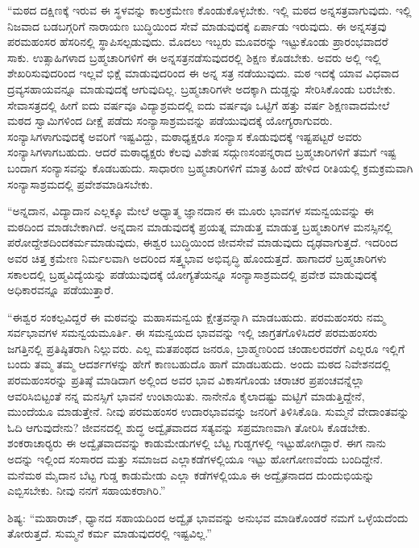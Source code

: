  “ಮಠದ ದಕ್ಷಿಣಕ್ಕೆ ಇರುವ ಈ ಸ್ಥಳವನ್ನು ಕಾಲಕ್ರಮೇಣ ಕೊಂಡುಕೊಳ್ಳಬೇಕು. ಇಲ್ಲಿ ಮಠದ ಅನ್ನಸತ್ರವಾಗುವುದು. ಇಲ್ಲಿ ನಿಜವಾದ ಬಡಬಗ್ಗರಿಗೆ ನಾರಾಯಣ ಬುದ್ಧಿಯಿಂದ ಸೇವೆ ಮಾಡುವುದಕ್ಕೆ ಏರ್ಪಾಡು ಇರುವುದು. ಈ ಅನ್ನಸತ್ರವು ಪರಮಹಂಸರ ಹೆಸರಿನಲ್ಲಿ ಸ್ಥಾಪಿಸಲ್ಪಡುವುದು. ಮೊದಲು ಇಬ್ಬರು ಮೂವರನ್ನು ಇಟ್ಟುಕೊಂಡು ಪ್ರಾರಂಭವಾದರೆ ಸಾಕು. ಉತ್ಸಾಹಿಗಳಾದ ಬ್ರಹ್ಮಚಾರಿಗಳಿಗೆ ಈ ಅನ್ನಸತ್ರ\break ನಡೆಸುವುದರಲ್ಲಿ ಶಿಕ್ಷಣ ಕೊಡಬೇಕು. ಅವರು ಅಲ್ಲಿ ಇಲ್ಲಿ ಶೇಖರಿಸುವುದರಿಂದ ಇಲ್ಲವೆ ಭಿಕ್ಷೆ ಮಾಡುವುದರಿಂದ ಈ ಅನ್ನ ಸತ್ರ ನಡೆಯುವುದು. ಮಠ ಇದಕ್ಕೆ ಯಾವ ವಿಧವಾದ ದ್ರವ್ಯಸಹಾಯವನ್ನೂ ಮಾಡುವುದಕ್ಕೆ ಆಗುವುದಿಲ್ಲ. ಬ್ರಹ್ಮಚಾರಿಗಳೇ ಅದಕ್ಕಾಗಿ ದುಡ್ಡನ್ನು ಸೇರಿಸಿಕೊಂಡು ಬರಬೇಕು. ಸೇವಾಸತ್ರದಲ್ಲಿ ಹೀಗೆ ಐದು ವರ್ಷವೂ ವಿದ್ಯಾಶ್ರಮದಲ್ಲಿ ಐದು ವರ್ಷವೂ ಒಟ್ಟಿಗೆ ಹತ್ತು ವರ್ಷ ಶಿಕ್ಷಣವಾದಮೇಲೆ ಮಠದ ಸ್ವಾಮಿಗಳಿಂದ ದೀಕ್ಷೆ ಪಡೆದು ಸಂನ್ಯಾಸಾಶ್ರಮವನ್ನು ಪಡೆಯುವುದಕ್ಕೆ ಯೋಗ್ಯರಾಗುವರು. ಸಂನ್ಯಾಸಿಗಳಾಗುವುದಕ್ಕೆ ಅವರಿಗೆ ಇಷ್ಟವಿದ್ದು, ಮಠಾಧ್ಯಕ್ಷರೂ ಸಂನ್ಯಾಸ ಕೊಡುವುದಕ್ಕೆ ಇಷ್ಟಪಟ್ಟರೆ ಅವರು ಸಂನ್ಯಾಸಿಗಳಾಗಬಹುದು. ಆದರೆ ಮಠಾಧ್ಯಕ್ಷರು ಕೆಲವು ವಿಶೇಷ ಸದ್ಗುಣಸಂಪನ್ನರಾದ ಬ್ರಹ್ಮಚಾರಿಗಳಿಗೆ ತಮಗೆ ಇಷ್ಟ ಬಂದಾಗ ಸಂನ್ಯಾಸವನ್ನು ಕೊಡಬಹುದು. ಸಾಧಾರಣ ಬ್ರಹ್ಮಚಾರಿಗಳಿಗೆ ಮಾತ್ರ ಹಿಂದೆ ಹೇಳಿದ ರೀತಿಯಲ್ಲಿ ಕ್ರಮಕ್ರಮವಾಗಿ ಸಂನ್ಯಾಸಾಶ್ರಮದಲ್ಲಿ ಪ್ರವೇಶಮಾಡಿಸಬೇಕು. 

 “ಅನ್ನದಾನ, ವಿದ್ಯಾದಾನ ಎಲ್ಲಕ್ಕೂ ಮೇಲೆ ಅಧ್ಯಾತ್ಮ ಜ್ಞಾನದಾನ ಈ ಮೂರು ಭಾವಗಳ ಸಮನ್ವಯವನ್ನು ಈ ಮಠದಿಂದ ಮಾಡಬೇಕಾಗಿದೆ. ಅನ್ನದಾನ ಮಾಡುವುದಕ್ಕೆ ಪ್ರಯತ್ನ ಮಾಡುತ್ತ ಮಾಡುತ್ತ ಬ್ರಹ್ಮಚಾರಿಗಳ ಮನಸ್ಸಿನಲ್ಲಿ ಪರೋದ್ದೇಶದಿಂದ\break ಕರ್ಮಮಾಡುವುದು, ಈಶ್ವರ ಬುದ್ಧಿಯಿಂದ ಜೀವಸೇವೆ ಮಾಡುವುದು ದೃಢವಾಗುತ್ತದೆ. ಇದರಿಂದ ಅವರ ಚಿತ್ತ ಕ್ರಮೇಣ ನಿರ್ಮಲವಾಗಿ ಅದರಿಂದ ಸತ್ತ್ವಭಾವ ಅಭಿವೃದ್ಧಿ ಹೊಂದುತ್ತದೆ. ಹಾಗಾದರೆ ಬ್ರಹ್ಮಚಾರಿಗಳು ಸಕಾಲದಲ್ಲಿ ಬ್ರಹ್ಮವಿದ್ಯೆಯನ್ನು ಪಡೆಯುವುದಕ್ಕೆ ಯೋಗ್ಯತೆಯನ್ನೂ ಸಂನ್ಯಾಸಾಶ್ರಮದಲ್ಲಿ ಪ್ರವೇಶ ಮಾಡುವುದಕ್ಕೆ ಅಧಿಕಾರವನ್ನೂ ಪಡೆಯುತ್ತಾರೆ. 

 “ಈಶ್ವರ ಸಂಕಲ್ಪವಿದ್ದರೆ ಈ ಮಠವನ್ನು ಮಹಾಸಮನ್ವಯ ಕ್ಷೇತ್ರವನ್ನಾಗಿ ಮಾಡಬಹುದು. ಪರಮಹಂಸರು ನಮ್ಮ ಸರ್ವಭಾವಗಳ ಸಮನ್ವಯಮೂರ್ತಿ. ಈ ಸಮನ್ವಯದ ಭಾವವನ್ನು ಇಲ್ಲಿ ಜಾಗ್ರತಗೊಳಿಸಿದರೆ ಪರಮಹಂಸರು ಜಗತ್ತಿನಲ್ಲಿ ಪ್ರತಿಷ್ಠಿತರಾಗಿ ನಿಲ್ಲುವರು. ಎಲ್ಲ ಮತಪಂಥದ ಜನರೂ, ಬ್ರಾಹ್ಮಣರಿಂದ ಚಂಡಾಲರವರೆಗೆ ಎಲ್ಲರೂ ಇಲ್ಲಿಗೆ ಬಂದು ತಮ್ಮ ತಮ್ಮ ಆದರ್ಶಗಳನ್ನು ಹೇಗೆ ಕಾಣಬಹುದೊ ಹಾಗೆ ಮಾಡಬಹುದು. ಅಂದು ಮಠದ ನಿವೇಶನದಲ್ಲಿ ಪರಮಹಂಸರನ್ನು ಪ್ರತಿಷ್ಠೆ ಮಾಡಿದಾಗ ಅಲ್ಲಿಂದ ಅವರ ಭಾವ ವಿಕಾಸಗೊಂಡು ಚರಾಚರ ಪ್ರಪಂಚವನ್ನೆಲ್ಲಾ ಆವರಿಸಿಬಿಟ್ಟಂತೆ ನನ್ನ ಮನಸ್ಸಿಗೆ ಭಾವನೆ ಉಂಟಾಯಿತು. ನಾನೇನೊ ಕೈಲಾದಷ್ಟು ಮಟ್ಟಿಗೆ ಮಾಡುತ್ತಿದ್ದೇನೆ, ಮುಂದೆಯೂ ಮಾಡುತ್ತೇನೆ. ನೀವು ಪರಮಹಂಸರ ಉದಾರಭಾವವನ್ನು ಜನರಿಗೆ ತಿಳಿಸಿಕೊಡಿ. ಸುಮ್ಮನೆ ವೇದಾಂತವನ್ನು ಓದಿ ಆಗುವುದೇನು? ಜೀವನದಲ್ಲಿ ಶುದ್ಧ ಅದ್ವೈತವಾದದ ಸತ್ಯವನ್ನು ಸಪ್ರಮಾಣವಾಗಿ ತೋರಿಸಿ ಕೊಡಬೇಕು. ಶಂಕರಾಚಾರ‍್ಯರು ಈ ಅದ್ವೈತವಾದವನ್ನು ಕಾಡುಮೇಡುಗಳಲ್ಲಿ ಬೆಟ್ಟ ಗುಡ್ಡಗಳಲ್ಲಿ ಇಟ್ಟುಹೋಗಿದ್ದಾರೆ. ಈಗ ನಾನು ಅದನ್ನು ಇಲ್ಲಿಂದ ಸಂಸಾರದ ಮತ್ತು ಸಮಾಜದ ಎಲ್ಲಾ\break ಕಡೆಗಳಲ್ಲಿಯೂ ಇಟ್ಟು ಹೋಗೋಣವೆಂದು ಬಂದಿದ್ದೇನೆ. ಮನೆಮಠ ಮೈದಾನ ಬೆಟ್ಟ ಗುಡ್ಡ ಕಾಡುಮೇಡು ಎಲ್ಲಾ ಕಡೆಗಳಲ್ಲಿಯೂ ಈ ಅದ್ವೈತನಾದದ ದುಂದುಭಿಯನ್ನು ಎಬ್ಬಿಸಬೇಕು. ನೀವು ನನಗೆ ಸಹಾಯಕರಾಗಿರಿ.” 

 ಶಿಷ್ಯ: “ಮಹಾರಾಜ್, ಧ್ಯಾನದ ಸಹಾಯದಿಂದ ಅದ್ವೈತ ಭಾವವನ್ನು ಅನುಭವ ಮಾಡಿಕೊಂಡರೆ ನಮಗೆ ಒಳ್ಳೆಯದೆಂದು ತೋರುತ್ತದೆ. ಸುಮ್ಮನೆ ಕರ್ಮ ಮಾಡುವುದರಲ್ಲಿ ಇಷ್ಟವಿಲ್ಲ.” 

